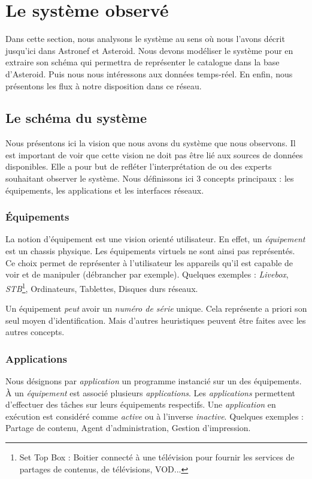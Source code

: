 \section{Le système observé}\label{sec:valid:domvision:systeme}
Dans cette section, nous analysons le système au sens où nous l'avons décrit jusqu'ici dans Astronef et Asteroid. Nous devons modéliser le système pour en extraire son schéma qui permettra de représenter le catalogue dans la base d'Asteroid. Puis nous nous intéressons aux données temps-réel. En enfin, nous présentons les flux à notre disposition dans ce réseau.

\subsection{Le schéma du système}
Nous présentons ici la vision que nous avons du système que nous observons. Il est important de voir que cette vision ne doit pas être lié aux sources de données disponibles. Elle a pour but de refléter l'interprétation de ou des experts souhaitant observer le système. Nous définissons ici 3 concepts principaux : les équipements, les applications et les interfaces réseaux.

\subsubsection{Équipements}
La notion d'équipement est une vision orienté utilisateur. En effet, un \textit{équipement} est un chassis physique. Les équipements virtuels ne sont ainsi pas représentés. Ce choix permet de représenter à l'utilisateur les appareils qu'il est capable de voir et de manipuler (débrancher par exemple). Quelques exemples : \textit{Livebox}, \textit{STB}\footnote{Set Top Box : Boitier connecté à une télévision pour fournir les services de partages de contenus, de télévisions, VOD...}, Ordinateurs, Tablettes, Disques durs réseaux.

Un équipement \textit{peut} avoir un \textit{numéro de série} unique. Cela représente a priori son seul moyen d'identification. Mais d'autres heuristiques peuvent être faites avec les autres concepts.

\subsubsection{Applications}
Nous désignons par \textit{application} un programme instancié sur un des équipements. À un \textit{équipement} est associé plusieurs \textit{applications}. Les \textit{applications} permettent d'effectuer des tâches sur leurs équipements respectifs. Une \textit{application} en exécution est considéré comme \textit{active} ou à l'inverse \textit{inactive}. Quelques exemples : Partage de contenu, Agent d'administration, Gestion d'impression.

